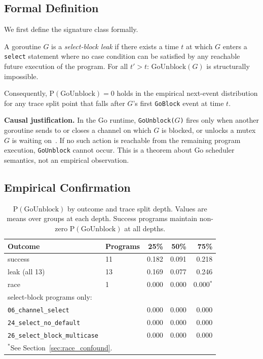 \documentclass[sigconf,review,anonymous]{acmart}
\begin{document}
\subsection{Formal Definition}

We first define the signature class formally.

\begin{definition}
\label{def:selectblock}
A goroutine $G$ is a \emph{select-block leak} if there exists a time $t$ at
which $G$ enters a \texttt{select} statement where no case condition can be
satisfied by any reachable future execution of the program. For all $t' > t$:
$\mathrm{GoUnblock}(G)$ is structurally impossible.

Consequently, $\mathrm{P(GoUnblock)=0}$ holds in the empirical next-event
distribution for any trace split point that falls after $G$'s first \texttt{GoBlock}
event at time $t$.
\end{definition}

\textbf{Causal justification.} In the Go runtime, \texttt{GoUnblock($G$)} fires
only when another goroutine sends to or closes a channel on which $G$ is blocked,
or unlocks a mutex $G$ is waiting on~\cite{gopkg_trace}. If no such action is
reachable from the remaining program execution, \texttt{GoUnblock} cannot occur.
This is a theorem about Go scheduler semantics, not an empirical observation.

\subsection{Empirical Confirmation}

\begin{table}[h]
\centering
\caption{$\mathrm{P(GoUnblock)}$ by outcome and trace split depth.
Values are means over groups at each depth. Success programs maintain
non-zero $\mathrm{P(GoUnblock)}$ at all depths.}
\label{tab:leak_sig}
\begin{tabular}{llrrr}
\toprule
\textbf{Outcome} & \textbf{Programs} & \textbf{25\%} & \textbf{50\%} & \textbf{75\%} \\
\midrule
success  & 11 & 0.182 & 0.091 & 0.218 \\
leak (all 13) & 13 & 0.169 & 0.077 & 0.246 \\
race    &  1 & 0.000 & 0.000 & 0.000$^*$ \\
\midrule
\multicolumn{5}{l}{\small select-block programs only:} \\
\texttt{06\_channel\_select}      & & 0.000 & 0.000 & 0.000 \\
\texttt{24\_select\_no\_default}  & & 0.000 & 0.000 & 0.000 \\
\texttt{26\_select\_block\_multicase} & & 0.000 & 0.000 & 0.000 \\
\bottomrule
\multicolumn{5}{l}{$^*$See Section~\ref{sec:race_confound}.}
\end{tabular}
\end{table}
\end{document}
